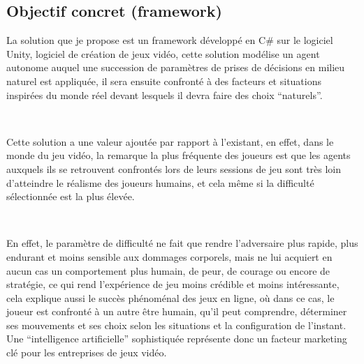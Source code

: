 \subsection{Objectif concret (framework)}

La solution que je propose est un framework développé en C# sur le logiciel Unity, logiciel de création de jeux vidéo, cette solution modélise un agent autonome auquel une succession de paramètres de prises de décisions en milieu naturel est appliquée, il sera ensuite confronté à des facteurs et situations inspirées du monde réel devant lesquels il devra faire des choix “naturels”.

~\par
Cette solution a une valeur ajoutée par rapport à l'existant, en effet, dans le monde du jeu vidéo, la remarque la plus fréquente des joueurs est que les agents auxquels ils se retrouvent confrontés lors de leurs sessions de jeu sont très loin d’atteindre le réalisme des joueurs humains, et cela même si la difficulté sélectionnée est la plus élevée.

~\par
En effet, le paramètre de difficulté ne fait que rendre l’adversaire plus rapide, plus endurant et moins sensible aux dommages corporels,  mais ne lui acquiert en aucun cas un comportement plus humain, de peur, de courage ou encore de stratégie, ce qui rend l'expérience de jeu moins crédible et moins intéressante, cela explique aussi le succès phénoménal des jeux en ligne, où dans ce cas, le joueur est confronté à un autre être humain, qu’il peut comprendre, déterminer ses mouvements et ses choix selon les situations et la configuration de l’instant. Une “intelligence artificielle” sophistiquée représente donc un facteur marketing clé pour les entreprises de jeux vidéo. 

